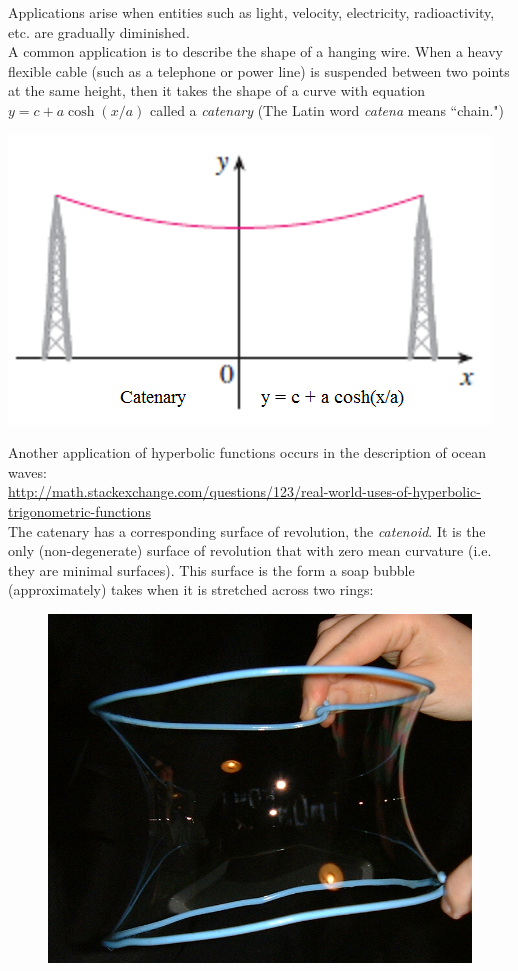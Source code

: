 
\begin{frame} 
Applications arise when entities such as light, velocity, electricity, radioactivity, etc. are gradually diminished.\\
A common application is to describe the shape of a hanging wire. When a heavy flexible cable (such as a telephone or power line) is suspended between two points at the same height, then it takes the shape of a curve with equation $ y=c+a\cosh(x/a) $ called a \textit{catenary}  (The Latin word \textit{catena} means ``chain.")\\
\begin{center}
\includegraphics[width=0.35\linewidth]{../../modules/hyperbolic-functions/pictures/catenary}
\end{center}
\end{frame}

\begin{frame} 
Another application of hyperbolic functions occurs in the description of ocean waves:\\
\url{http://math.stackexchange.com/questions/123/real-world-uses-of-hyperbolic-trigonometric-functions} \\
The catenary has a corresponding surface of revolution, the \textit{catenoid}. It is the only (non-degenerate) surface of revolution that with zero mean curvature (i.e. they are minimal surfaces). This surface is the form a soap bubble (approximately) takes when it is stretched across two rings:

\begin{figure}
\centering
\includegraphics[width=0.5\linewidth]{../../modules/hyperbolic-functions/pictures/catenoide}
\end{figure}

\end{frame}
